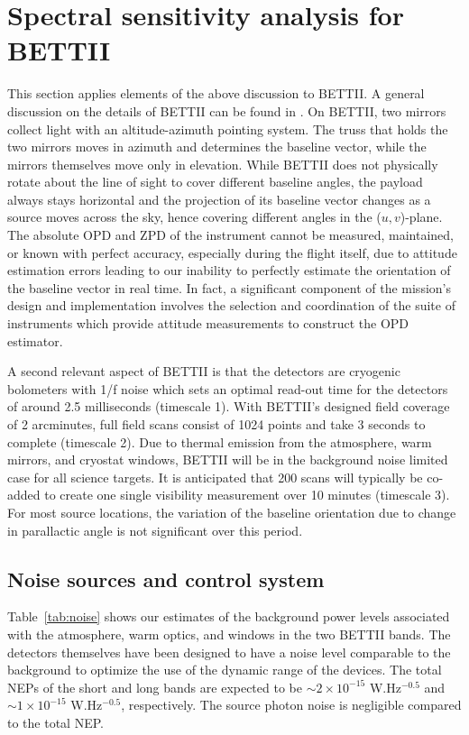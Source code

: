 \section{Spectral sensitivity analysis for BETTII}
\label{sec:implications}
This section applies elements of the above discussion to BETTII. A general discussion on the details of BETTII can be found in \citep{Rinehart:2014gk}.
On BETTII, two mirrors collect light with an altitude-azimuth pointing system. The truss that holds the two mirrors moves in azimuth and determines the baseline vector, while the mirrors themselves move only in elevation. While BETTII does not physically rotate about the line of sight to cover different baseline angles, the payload always stays horizontal and the projection of its baseline vector changes as a source moves across the sky, hence covering different angles in the ($u, v$)-plane. The absolute OPD and ZPD of the instrument cannot be
measured, maintained, or known with perfect accuracy, especially during the flight itself, due to attitude estimation errors leading to our inability to perfectly estimate the orientation of the baseline vector in real time. In fact, a significant component of the mission's
design and implementation involves the selection and coordination of the suite of instruments which provide attitude measurements to construct the OPD estimator.

A second relevant aspect of BETTII is that the detectors are cryogenic bolometers \cite[see][for similar architectures]{Staguhn:2014kl} with 1/f noise which
sets an optimal read-out time for the detectors of around 2.5 milliseconds (timescale 1). With BETTII's designed field coverage
of 2 arcminutes, full field scans consist of 1024 points and take 3 seconds to complete (timescale 2). Due to thermal emission from the atmosphere,
warm mirrors, and cryostat windows, BETTII will be in the background noise limited case for all science targets.
It is anticipated that 200 scans will typically be co-added to create one single visibility measurement over 10 minutes (timescale 3). 
For most source locations, the variation of the baseline orientation due to change in parallactic angle is not significant over this period.

\subsection{Noise sources and control system}
Table~\ref{tab:noise} shows our estimates of the
background power levels associated with the atmosphere, warm optics, and windows in the two BETTII bands. 
The detectors themselves have been designed to have a noise level comparable to the background to optimize the use of the
dynamic range of the devices. The total NEPs of the short and long bands are expected to be $\sim 2\times 10^{-15}$ W.Hz$^{-0.5}$ and $\sim 1\times 10^{-15}$ W.Hz$^{-0.5}$, respectively. The source photon noise is negligible compared to the total NEP. 

